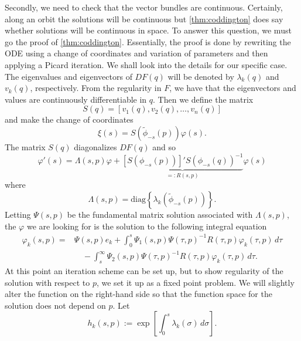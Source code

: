 Secondly, we need to check that the vector bundles are continuous. Certainly, along an orbit the solutions will be continuous but \cref{thm:coddington} does say whether solutions will be continuous in space. To answer this question, we must go the proof of \cref{thm:coddington}. Essentially, the proof is done by rewriting the ODE using a change of coordinates and variation of parameters and then applying a Picard iteration. We shall look into the details for our specific case. The eigenvalues and eigenvectors of \(DF(q)\) will be denoted by \(\lambda_k(q)\) and \(v_k(q)\), respectively. From the regularity in \(F\), we have that the eigenvectors and values are continuously differentiable in \(q\). Then we define the matrix
\begin{equation*}
	S(q) = [v_1(q), v_2(q), \ldots, v_n(q)]
\end{equation*}
and make the change of coordinates
\begin{equation*}
	\xi(s) = S(\tilde \phi_{-s} (p)) \varphi(s).
\end{equation*}
The matrix \(S(q)\) diagonalizes \(DF(q)\) and so 
\begin{equation*}
	\varphi'(s) = \Lambda(s,p)\varphi + \underbrace{[S(\phi_{-s}(p))]' S(\phi_{-s}(q))^{-1}}_{=: R(s,p)} \varphi(s)
\end{equation*}
where 
\begin{equation*}
	\Lambda(s,p) = \mathrm{diag} \left\{  \lambda_k(\tilde\phi_{-s}(p))\right\}.
\end{equation*}
Letting \(\Psi(s,p)\) be the fundamental matrix solution associated with \(\Lambda(s,p)\), the \(\varphi\) we are looking for is the solution to the following integral equation
\begin{equation}\label{variation-of-constants}
\begin{aligned}
		\varphi_k(s,p) = &\Psi(s,p) e_k + \int_0^s \Psi_1(s, p) \Psi(\tau, p)^{-1}R(\tau, p) \varphi_k(\tau,p)\, d\tau \\
		&\quad - \int_s^\infty \Psi_2(s,p) \Psi(\tau, p)^{-1} R(\tau, p) \varphi_k(\tau, p)\, d\tau.
\end{aligned}
\end{equation}
At this point an iteration scheme can be set up, but to show regularity of the solution with respect to \(p\), we set it up as a fixed point problem. We will slightly alter the function on the right-hand side so that the function space for the solution does not depend on \(p\). Let 
\begin{equation*}
	h_k(s,p) := \exp\left[\int_0^s \lambda_k(\sigma)\, d\sigma\right].
\end{equation*}
